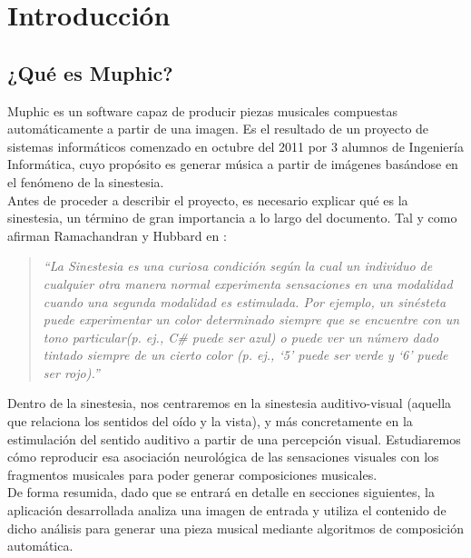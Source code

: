 \chapter{Introducción}
\label{chap:intro}



	\section{¿Qué es Muphic?}
	\label{sec:quees}
	
		\vspace{0.2in}
		Muphic es un software capaz de producir piezas musicales compuestas automáticamente a partir de una imagen. Es el resultado de un proyecto de sistemas informáticos comenzado en octubre del 2011 por 3 alumnos de Ingeniería Informática, cuyo propósito es generar música a partir de imágenes basándose en el fenómeno de la sinestesia.\\
		
		Antes de proceder a describir el proyecto, es necesario explicar qué es la sinestesia, un término de gran importancia a lo largo del documento. Tal y como afirman Ramachandran y Hubbard en \cite[pg.~4]{paperSyn}:
		
		\begin{quote}
		\emph{``La Sinestesia es una curiosa condición según la cual un individuo de cualquier otra manera normal experimenta sensaciones en una modalidad cuando una segunda modalidad es estimulada. Por ejemplo, un sinésteta puede experimentar un color determinado siempre que se encuentre con un tono particular(p. ej., C\# puede ser azul) o puede ver un número dado tintado siempre de un cierto color (p. ej., ‘5’ puede ser verde y ‘6’ puede ser rojo).''}
		\end{quote}
		
		Dentro de la sinestesia, nos centraremos en la sinestesia auditivo-visual (aquella que relaciona los sentidos del oído y la vista), y más concretamente en la estimulación del sentido auditivo a partir de una percepción visual. Estudiaremos cómo reproducir esa asociación neurológica de las sensaciones visuales con los fragmentos musicales para poder generar composiciones musicales.\\
		 
		
		De forma resumida, dado que se entrará en detalle en secciones siguientes, la aplicación desarrollada analiza una imagen de entrada y utiliza el contenido de dicho análisis para generar una pieza musical mediante algoritmos de composición automática.\\

